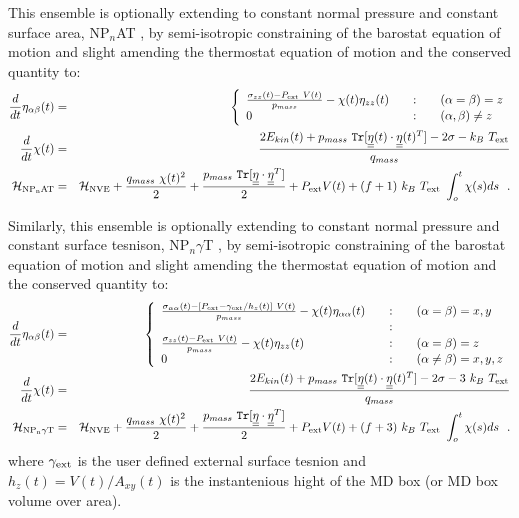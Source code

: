 This ensemble is optionally extending to constant normal pressure
and constant surface area, NP$_{n}$AT \cite{ikeguchi-04}, by semi-isotropic
constraining of the barostat equation of motion and slight amending
the thermostat equation of motion and the conserved quantity to:
\begin{eqnarray}
\frac{d}{dt} \eta_{\alpha\beta}(t) &=& \left\{ \begin{array} {l@{\qquad:\qquad}l}
\frac{\sigma_{zz}(t) - P_{\rm ext}~V(t)}{p_{mass}} -
\chi(t) \eta_{zz}(t) & (\alpha = \beta) = z \\
0 & (\alpha,\beta) \ne z
\end{array} \right. \nonumber \\
\frac{d}{dt} \chi(t) &=& \frac{2 E_{kin}(t) + p_{mass}~{\tt Tr}[\mat{\eta}(t) \cdot
\mat{\eta}(t)^{T}] - 2 \sigma - k_{B}~T_{\rm ext}}{q_{mass}} \\
{\cal H}_{\rm NP_{n}AT} &=& {\cal H}_{\rm NVE} + {q_{mass}~\chi (t)^{2} \over 2} +
{p_{mass}~{\tt Tr}[\mat{\eta} \cdot \mat{\eta}^{T}] \over 2} + P_{\rm ext} V(t) +
(f+1)~k_{B}~T_{\rm ext}~\int_o^t \chi (s) ds~~. \nonumber
\end{eqnarray}

Similarly, this ensemble is optionally extending to constant
normal pressure and constant surface tesnison, NP$_{n}\gamma$T
\cite{ikeguchi-04}, by semi-isotropic constraining of the
barostat equation of motion  and slight amending the thermostat
equation of motion and the conserved quantity to:
\begin{eqnarray}
\frac{d}{dt} \eta_{\alpha\beta}(t) &=& \left\{ \begin{array} {l@{\qquad:\qquad}l}
\frac{\sigma_{\alpha\alpha}(t) - \left[ P_{\rm ext} - \gamma_{\rm ext} / h_{z}(t) \right]~V(t)}{p_{mass}} -
\chi(t) \eta_{\alpha\alpha}(t) & (\alpha = \beta) = x,y \\
& \\
\frac{\sigma_{zz}(t) - P_{\rm ext}~V(t)}{p_{mass}} -
\chi(t) \eta_{zz}(t) & (\alpha = \beta) = z \\
0 & (\alpha \ne \beta) = x,y,z
\end{array} \right. \nonumber \\
\frac{d}{dt} \chi(t) &=& \frac{2 E_{kin}(t) + p_{mass}~{\tt Tr}[\mat{\eta}(t) \cdot
\mat{\eta}(t)^{T}] - 2 \sigma - 3~k_{B}~T_{\rm ext}}{q_{mass}} \\
{\cal H}_{\rm NP_{n}\gamma T} &=& {\cal H}_{\rm NVE} + {q_{mass}~\chi (t)^{2} \over 2} +
{p_{mass}~{\tt Tr}[\mat{\eta} \cdot \mat{\eta}^{T}] \over 2} + P_{\rm ext} V(t) +
(f+3)~k_{B}~T_{\rm ext}~\int_o^t \chi (s) ds~~. \nonumber
\end{eqnarray}
where $\gamma_{\rm ext}$ is the user defined external surface tesnion
and $h_{z}(t) = V(t) / A_{xy}(t)$ is the instantenious hight of the
MD box (or MD box volume over area).

